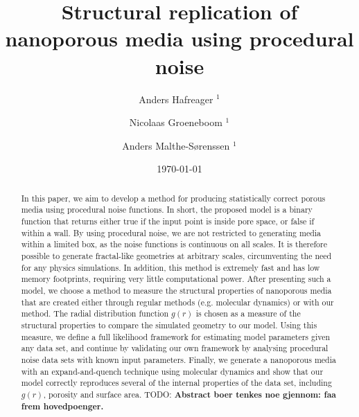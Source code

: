\documentclass[aps,pre,twocolumn,letterpaper,floatfix,showpacs]{revtex4}
\newcommand{\todo}[1]{ {\color{Magenta} TODO: \color{Blue} \textbf{#1} }}
\begin{document}
\title{Structural replication of nanoporous media using procedural noise}
\author{Anders Hafreager $^{1}$} 
\author{Nicolaas Groeneboom $^{1}$} 
\author{Anders Malthe-S\o renssen $^1$}
\date{\today} 

\begin{abstract} 
In this paper, we aim to develop a method for producing statistically correct porous media using procedural noise functions. In short, the proposed model is a binary function that returns either true if the input point is inside pore space, or false if within a wall. By using procedural noise, we are not restricted to generating media within a limited box, as the noise functions is continuous on all scales. It is therefore possible to generate fractal-like geometries at arbitrary scales, circumventing the need for any physics simulations. In addition, this method is extremely fast and has low memory footprints, requiring very little computational power. After presenting such a model, we choose a method to measure the structural properties of nanoporous media that are created either through regular methods (e.g. molecular dynamics) or with our method. The radial distribution function $g(r)$ is chosen as a measure of the structural properties to compare the simulated geometry to our model. Using this measure, we define a full likelihood framework for estimating model parameters given any data set, and continue by validating our own framework by analysing procedural noise data sets with known input parameters. Finally, we generate a nanoporous media with an expand-and-quench technique using molecular dynamics and show that our model correctly reproduces several of the internal properties of the data set, including $g(r)$, porosity and surface area. 
  \todo{Abstract boer tenkes noe gjennom: faa frem hovedpoenger.}   

\end{abstract} 
 
\maketitle
 
\end{document}
